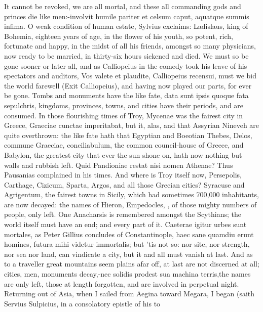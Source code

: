 {It cannot be revoked, we are all mortal, and these all commanding gods
and princes die like men:-involvit humile pariter et celsum
caput, aquatque summis infima. O weak condition of human estate,
Sylvius exclaims: Ladislaus, king of Bohemia, eighteen years of
age, in the flower of his youth, so potent, rich, fortunate and happy,
in the midst of all his friends, amongst so many physicians, now
ready to be  married, in thirty-six hours sickened and died. We
must so be gone sooner or later all, and as Calliopeius in the comedy
took his leave of his spectators and auditors, Vos valete et plaudite,
Calliopeius recensui, must we bid the world farewell (Exit
Calliopeius), and having now played our parts, for ever be gone. Tombs
and monuments have the like fate, data sunt ipsis quoque fata
sepulchris, kingdoms, provinces, towns, and cities have their periods,
and are consumed. In those flourishing times of Troy, Mycenae was the
fairest city in Greece, Graeciae cunctae imperitabat, but it, alas, and
that Assyrian Nineveh are quite overthrown: the like fate hath
that Egyptian and Boeotian Thebes, Delos, commune Graeciae,
conciliabulum, the common council-house of Greece, and Babylon,
the greatest city that ever the sun shone on, hath now nothing but
walls and rubbish left. Quid Pandioniae restat nisi nomen
Athenae? Thus Pausanias complained in his times. And where is
Troy itself now, Persepolis, Carthage, Cizicum, Sparta, Argos, and all
those Grecian cities? Syracuse and Agrigentum, the fairest towns in
Sicily, which had sometimes 700,000 inhabitants, are now decayed: the
names of Hieron, Empedocles, \etc{}, of those mighty numbers of people,
only left. One Anacharsis is remembered amongst the Scythians; the
world itself must have an end; and every part of it. Caeterae igitur
urbes sunt mortales, as Peter Gillius concludes of
Constantinople, haec sane quamdiu erunt homines, futura mihi videtur
immortalis; but 'tis not so: nor site, nor strength, nor sea nor land,
can vindicate a city, but it and all must vanish at last. And as to a
traveller great mountains seem plains afar off, at last are not
discerned at all; cities, men, monuments decay,-nec solidis prodest sua
machina terris,the names are only left, those at length
forgotten, and are involved in perpetual night.
Returning out of Asia, when I sailed from Aegina toward Megara, I
began (saith Servius Sulpicius, in a consolatory epistle of his to
}
